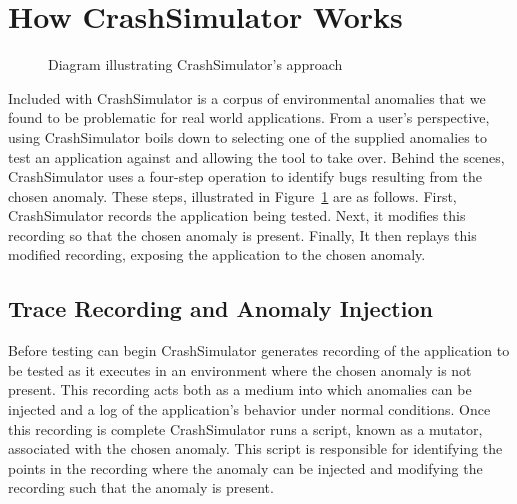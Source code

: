 \section{How CrashSimulator Works}
\label{SEC:approach}

\begin{figure}[t]
  \center{}
  \caption{Diagram illustrating CrashSimulator's approach}
  \label{figure:approach}
\end{figure}

Included with CrashSimulator is a corpus of environmental anomalies
that we found to be problematic for real world
applications.
From a user's perspective, using CrashSimulator boils down to selecting one
of the supplied anomalies to test an application against and allowing the
tool to take over.  Behind the scenes,
CrashSimulator uses a four-step operation to identify bugs resulting from
the chosen anomaly.
These steps, illustrated in Figure~\ref{figure:approach} are as follows.
First, CrashSimulator records the application being tested.  Next, it
modifies this recording so that the chosen anomaly is present.
Finally, It then replays this
modified recording, exposing the application to the chosen anomaly.

\subsection{Trace Recording and Anomaly Injection}

Before testing can begin
CrashSimulator generates recording of the application to be
tested as it executes in an environment where the chosen anomaly is not
present.  This recording acts both as a medium into which anomalies can be
injected and a log of the application's behavior under normal
conditions.  Once this recording is complete CrashSimulator runs a script,
known as a mutator, associated with the chosen anomaly.
This script is responsible for identifying
the points in the recording
where the anomaly can be injected and modifying
the recording such that the anomaly is present.

